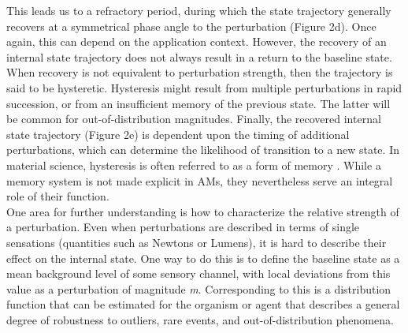 \documentclass{sigchi}
\begin{document}
This leads us to a refractory period, during which the state trajectory generally recovers at a symmetrical phase angle to the perturbation (Figure 2d). Once again, this can depend on the application context. However, the recovery of an internal state trajectory does not always result in a return to the baseline state. When recovery is not equivalent to perturbation strength, then the trajectory is said to be hysteretic. Hysteresis might result from multiple perturbations in rapid succession, or from an insufficient memory of the previous state. The latter will be common for out-of-distribution magnitudes. Finally, the recovered internal state trajectory (Figure 2e) is dependent upon the timing of additional perturbations, which can determine the likelihood of transition to a new state. In material science, hysteresis is often referred to as a form of memory \cite{ortin}. While a memory system is not made explicit in AMs, they nevertheless serve an integral role of their function.\\
One area for further understanding is how to characterize the relative strength of a perturbation. Even when perturbations are described in terms of single sensations (quantities such as Newtons or Lumens), it is hard to describe their effect on the internal state. One way to do this is to define the baseline state as a mean background level of some sensory channel, with local deviations from this value as a perturbation of magnitude \textit{m}. Corresponding to this is a distribution function that can be estimated for the organism or agent that describes a general degree of robustness to outliers, rare events, and out-of-distribution phenomena.
\end{document}
